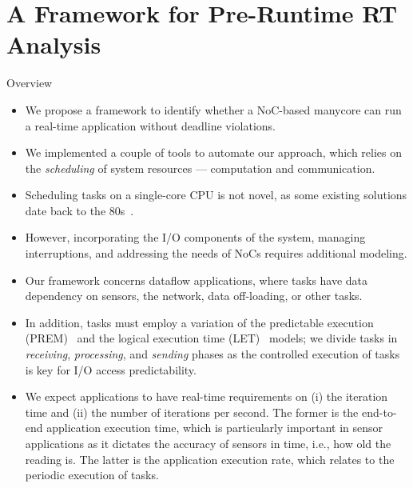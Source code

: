 \section{A Framework for Pre-Runtime RT Analysis}

\begin{frame}{Overview}
	\begin{itemize}
		\item We propose a framework to identify whether a NoC-based manycore can run a real-time application without deadline violations. 
		
		\item We implemented a couple of tools to automate our approach, which relies on the \textit{scheduling} of system resources --- computation and communication. 
		
		\item Scheduling tasks on a single-core CPU is not novel, as some existing solutions date back to the 80s~\cite{gusfield:1984}. 
		
		\item However, incorporating the I/O components of the system, managing interruptions, and addressing the needs of NoCs requires additional modeling.
	\end{itemize}
\end{frame}

\begin{frame}
	\begin{itemize}
	\item Our framework concerns dataflow applications, where tasks have data dependency on sensors, the network, data off-loading, or other tasks. 
	
	\item In addition, tasks must employ a variation of the predictable execution (PREM)~\cite{Senoussaoui:2022} and the logical execution time (LET)~\cite{Gemlau:2021} models; we divide tasks in \emph{receiving}, \emph{processing}, and \emph{sending} phases as the controlled execution of tasks is key for I/O access predictability. 
	
	\item We expect applications to have real-time requirements on (i) the iteration time and (ii) the number of iterations per second. The former is the end-to-end application execution time, which is particularly important in sensor applications as it dictates the accuracy of sensors in time, i.e., how old the reading is. The latter is the application execution rate, which relates to the periodic execution of tasks.
	\end{itemize}
\end{frame}

